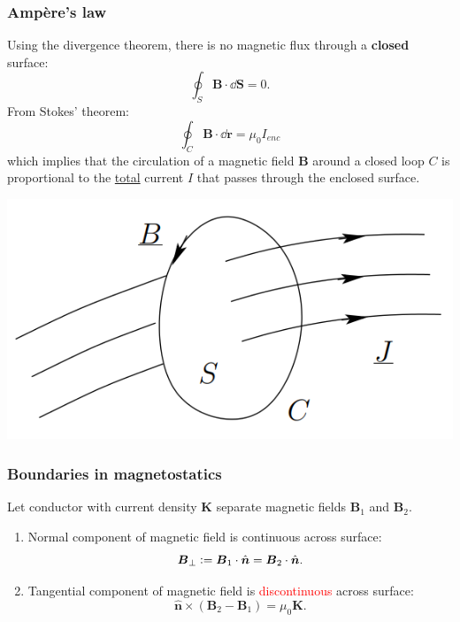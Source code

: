 \documentclass{article}
\newcommand{\deq}{\vcentcolon=}
\newcommand{\vc}[1]{\boldsymbol{#1}}
\begin{document}
\begin{multicols*}{3}
\subsubsection*{Amp\`ere's law}
Using the divergence theorem, there is 
no magnetic flux through a \textbf{closed} surface:
$$\oint_S\vc{B}\cdot\dd\vc{S}=0.$$
From Stokes' theorem:
$$\oint_C\vc{B}\cdot\dd\vc{r}=\mu_0 I_{enc}$$
which implies that the circulation of a magnetic field $\vc{B}$
around a closed loop $C$ is proportional to
the \underline{total} current $I$ that passes through
the enclosed surface.

\begin{center}
    \includegraphics[scale=0.4]{f08.png}
\end{center}

\subsubsection*{Boundaries in magnetostatics}
Let conductor with current density $\vc{K}$
separate magnetic fields $\vc{B}_1$ and $\vc{B}_2$.
\begin{enumerate}
    \item Normal component of magnetic field
    is continuous across surface:
    $$\vc{B}_{\perp}\deq
    \vc{B}_1\cdot\hat{\vc{n}}=\vc{B}_2\cdot\hat{\vc{n}}.$$

    \item Tangential component of magnetic field
    is \textcolor{red}{discontinuous} across surface:
    $$\hat{\vc{n}}\times(\vc{B}_2-\vc{B}_1)=\mu_0\vc{K}.$$
\end{enumerate}


\end{multicols*}
\end{document}
